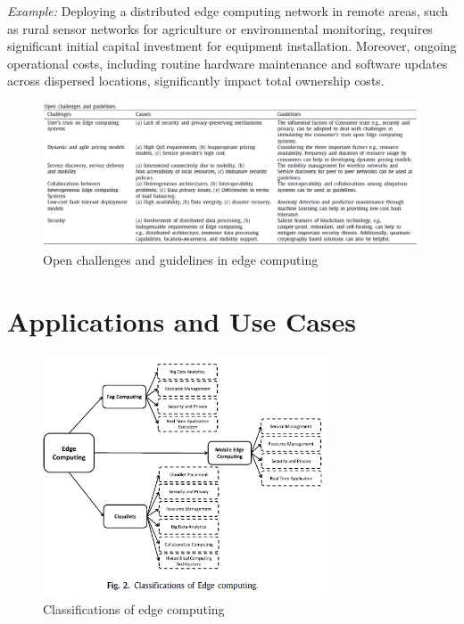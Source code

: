 \documentclass[runningheads]{llncs}
\begin{document}
\noindent\textit{Example:} Deploying a distributed edge computing network in remote areas, such as rural sensor networks for agriculture or environmental monitoring, requires significant initial capital investment for equipment installation. Moreover, ongoing operational costs, including routine hardware maintenance and software updates across dispersed locations, significantly impact total ownership costs.

\begin{figure}[ht]
    \centering
    \includegraphics[width=\textwidth]{IMG/3.png}
    \caption{Open challenges and guidelines in edge computing}
    \label{fig:open_challenges_guidelines}
    \end{figure}
\FloatBarrier

\section{Applications and Use Cases}

\begin{figure}[ht]
    \centering
    \includegraphics[width=0.75\textwidth]{IMG/1.png}
    \caption{Classifications of edge computing}
    \label{fig:edge_classifications}
    \end{figure}
\FloatBarrier
\end{document}
